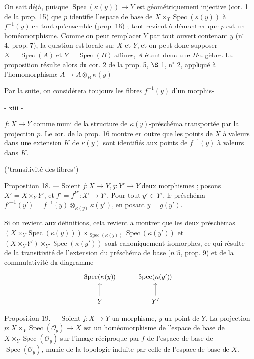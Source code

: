 On sait déjà, puisque $\operatorname{Spec}(\kappa(y)) \to Y$ est géométriquement injective (cor. 1 de la prop. 15) que $p$ identifie l'espace de base de $X \times_Y \operatorname{Spec}(\kappa(y))$ à $f^{-1}(y)$ en tant qu'ensemble (prop. 16) ; tout revient à démontrer que $p$ est un homéomorphisme. Comme on peut remplacer $Y$ par tout ouvert contenant $y$ (n$^\circ$ 4, prop. 7), la question est locale sur $X$ et $Y$, et on peut donc supposer $X = \operatorname{Spec}(A)$ et $Y = \operatorname{Spec}(B)$ affines, $A$ étant donc une $B$-algèbre. La proposition résulte alors du cor. 2 de la prop. 5, $\S$ 1, n$^\circ$ 2, appliqué à l'homomorphisme $A \to A \otimes_B \kappa(y)$.

Par la suite, on considérera toujours les fibres $f^{-1}(y)$ d'un morphis-

\newpage


- xiii -

$f: X \to Y$ comme muni de la structure de $\kappa(y)$-préschéma transportée par la projection $p$. Le cor. de la prop. 16 montre en outre que les points de $X$ à valeurs dans une extension $K$ de $\kappa(y)$ sont identifiés aux points de $f^{-1}(y)$ à valeurs dans $K$.

("transitivité des fibres")

Proposition 18. — Soient $f : X \to Y, g : Y' \to Y$ deux morphismes ; posons $X' = X \times_Y Y'$, et $f' = f^{Y'} : X' \to Y'$. Pour tout $y' \in Y'$, le préschéma $f'^{-1}(y') = f^{-1}(y) \otimes_{\kappa(y)} \kappa(y')$, en posant $y = g(y')$.

Si on revient aux définitions, cela revient à montrer que les deux préschémas $(X \times_Y \operatorname{Spec}(\kappa(y))) \times_{\operatorname{Spec}(\kappa(y))} \operatorname{Spec}(\kappa(y'))$ et $(X \times_Y Y') \times_{Y'} \operatorname{Spec}(\kappa(y'))$ sont canoniquement isomorphes, ce qui résulte de la transitivité de l'extension du préschéma de base ($n^\circ 5$, prop. 9) et de la commutativité du diagramme
$$
\begin{tikzcd}
\operatorname{Spec}(\kappa(y)) & \operatorname{Spec}(\kappa(y')) \\
Y \arrow[u] & Y' \arrow[u]
\end{tikzcd}
$$

Proposition 19. — Soient $f : X \to Y$ un morphisme, $y$ un point de $Y$. La projection $p : X \times_Y \operatorname{Spec}(\mathcal{O}_y) \to X$ est un homéomorphisme de l'espace de base de $X \times_Y \operatorname{Spec}(\mathcal{O}_y)$ sur l'image réciproque par $f$ de l'espace de base de $\operatorname{Spec}(\mathcal{O}_y)$, munie de la topologie induite par celle de l'espace de base de $X$.

